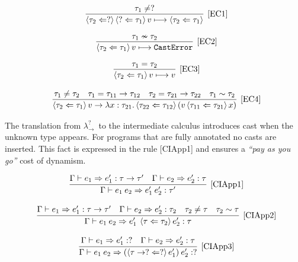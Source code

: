 \documentclass{article}
\newcommand\tcast[2]{\left\langle #1 \Leftarrow #2 \right\rangle }
\newcommand{\quotes}[1]{``#1''}
\newcommand\gstlc[0]{$\lambda^?_{\rightarrow}$}
\newcommand\gij[3]{\Gamma \vdash #1 \Rightarrow #2 : #3 }
\newcommand\rulename[1]{\mathrm{\text{[#1]}}}
\newcommand\irname[1]{[#1]}
\begin{document}
\[
\begin{tabular}{c}

\infer[\rulename{EC1}] 
{\tcast{\tau_2}{?} \tcast{?}{\tau_1} v \longmapsto  \tcast{\tau_2}{\tau_1} }
{\tau_1 \neq ?}

\\
\\

\infer[\rulename{EC2}] 
{\tcast{\tau_2}{\tau_1} v \longmapsto \texttt{CastError}}
{\tau_1 \nsim \tau_2 }

\\
\\

\infer[\rulename{EC3}] 
{\tcast{\tau_2}{\tau_1} v \longmapsto v }
{\tau_1 = \tau_2}
\\
\\
\infer[\rulename{EC4}] 
{\tcast{\tau_2}{\tau_1} v \rightarrow 
\lambda x : \tau_{21}. \tcast{\tau_{22}}{\tau_{12}} (v \tcast{\tau_{11}}{\tau_{21}} x) }
{\tau_1 \neq \tau_2 \quad \tau_1 = \tau_{11} \rightarrow \tau_{12}
\quad \tau_2 = \tau_{21} \rightarrow \tau_{22} \quad \tau_1 \sim \tau_2} 

\end{tabular}
\]

The translation from \gstlc~to the intermediate calculus introduces cast when the unknown type appears. For programs that are fully annotated no casts are inserted. This fact is expressed in the rule \irname{CIApp1} and ensures a \textit{\quotes{pay as you go}} cost of dynamism. 

\[
\begin{tabular}{c}
\infer[\rulename{CIApp1}] 
{\gij{e_1 \: e_2}{e'_1 \: e'_2}{\tau'}}
{\gij{e_1}{e'_1}{\tau \rightarrow \tau'} \quad \gij{e_2}{e'_2}{\tau}}

\\ 
\\
\infer[\rulename{CIApp2}] 
{\gij{e_1 \: e_2}{e'_1 \: \tcast{\tau}{\tau_2} e'_2}{\tau} }
{\gij{e_1}{e'_1}{\tau \rightarrow \tau'} \quad \gij{e_2}{e'_2}{\tau_2}
\quad \tau_2 \neq \tau \quad \tau_2 \sim \tau}

\\
\\ 

\infer[\rulename{CIApp3}] 
{\gij{e_1 \: e_2}{(\tcast{\tau \rightarrow ?}{?} e'_1) \: e'_2}{?} }
{\gij{e_1}{e'_1}{?} \quad \gij{e_2}{e'_2}{\tau}}
\end{tabular}
\]
\end{document}

